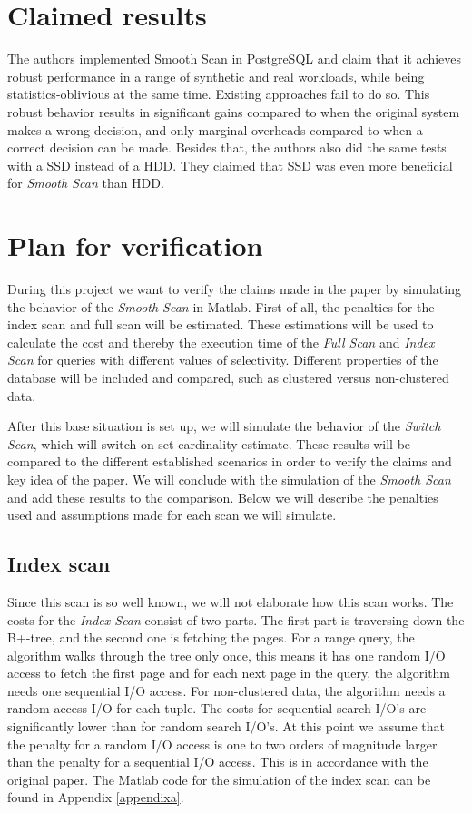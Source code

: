 \documentclass[a4paper,11pt,twoside]{article}
\begin{document}
\section{Claimed results}
The authors implemented Smooth Scan in PostgreSQL and claim that it achieves robust performance in a range of synthetic and real workloads, while being statistics-oblivious at the same time. Existing approaches fail to do so. This robust behavior results in significant gains compared to when the original system makes a wrong decision, and only marginal overheads compared to when a correct decision can be made. Besides that, the authors also did the same tests with a SSD instead of a HDD. They claimed that SSD was even more beneficial for \emph{Smooth Scan} than HDD.

\section{Plan for verification}
During this project we want to verify the claims made in the paper by simulating the behavior of the \emph{Smooth Scan} in Matlab. First of all, the penalties for the index scan and full scan will be estimated. These estimations will be used to calculate the cost and thereby the execution time of the \emph{Full Scan} and \emph{Index Scan} for queries with different values of selectivity. Different properties of the database will be included and compared, such as clustered versus non-clustered data.

After this base situation is set up, we will simulate the behavior of the \emph{Switch Scan}, which will switch on set cardinality estimate. These results will be compared to the different established scenarios in order to verify the claims and key idea of the paper. We will conclude with the simulation of the \emph{Smooth Scan} and add these results to the comparison. Below we will describe the penalties used and assumptions made for each scan we will simulate.


\subsection{Index scan}
Since this scan is so well known, we will not elaborate how this scan works. The costs for the \textit{Index Scan} consist of two parts. The first part is traversing down the B+-tree, and the second one is fetching the pages. For a range query, the algorithm walks through the tree only once, this means it has one random I/O access to fetch the first page and for each next page in the query, the algorithm needs one sequential I/O access. For non-clustered data, the algorithm needs a random access I/O for each tuple. The costs for sequential search I/O's are significantly lower than for random search I/O's. At this point we assume that the penalty for a random I/O access is one to two orders of magnitude larger than the penalty for a sequential I/O access. This is in accordance with the original paper. The Matlab code for the simulation of the index scan can be found in Appendix \ref{appendixa}.
\end{document}
